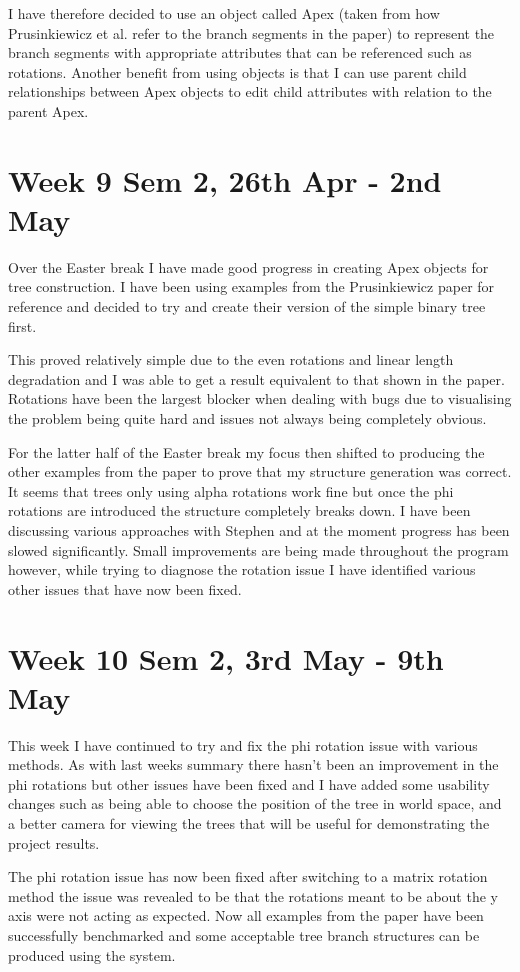 \documentclass[11pt]{article}
\begin{document}
I have therefore decided to use an object called Apex (taken from how Prusinkiewicz et al. refer 
to the branch segments in the paper) to represent the branch segments with appropriate attributes 
that can be referenced such as rotations. Another benefit from using objects is that I can use 
parent child relationships between Apex objects to edit child attributes with relation to the 
parent Apex.

\section*{Week 9 Sem 2, 26th Apr - 2nd May}
Over the Easter break I have made good progress in creating Apex objects for tree construction.
I have been using examples from the Prusinkiewicz paper for reference and decided to try and 
create their version of the simple binary tree first. 

This proved relatively simple due to the even rotations and linear length degradation and I was 
able to get a result equivalent to that shown in the paper. Rotations have been the largest blocker 
when dealing with bugs due to visualising the problem being quite hard and issues not always being 
completely obvious.

For the latter half of the Easter break my focus then shifted to producing the other examples from 
the paper to prove that my structure generation was correct. It seems that trees only using alpha 
rotations work fine but once the phi rotations are introduced the structure completely breaks down.
I have been discussing various approaches with Stephen and at the moment progress has been slowed 
significantly. Small improvements are being made throughout the program however, while trying to 
diagnose the rotation issue I have identified various other issues that have now been fixed.

\section*{Week 10 Sem 2, 3rd May - 9th May}
This week I have continued to try and fix the phi rotation issue with various methods. As with 
last weeks summary there hasn't been an improvement in the phi rotations but other issues have 
been fixed and I have added some usability changes such as being able to choose the position of 
the tree in world space, and a better camera for viewing the trees that will be useful for 
demonstrating the project results.

The phi rotation issue has now been fixed after switching to a matrix rotation method the issue 
was revealed to be that the rotations meant to be about the y axis were not acting as expected. 
Now all examples from the paper have been successfully benchmarked and some acceptable tree 
branch structures can be produced using the system.
\end{document}
